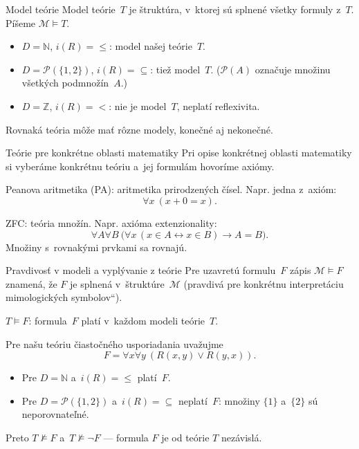 \documentclass[12pt]{beamer}
\providecommand{\uv}[1]{\quotedblbase #1\textquotedblleft}
\newcommand{\limpl}{\rightarrow}
\begin{document}
\begin{frame}{Model teórie}
  \alert{Model teórie~$T$} je štruktúra, v~ktorej sú splnené všetky formuly z~$T$.
  Píšeme $\mathcal M\models T$.
  \begin{itemize}
    \item $D=\mathbb N$, $i(R)={\le}$: model našej teórie~$T$.
    \item $D=\mathcal P(\{1,2\})$, $i(R)={\subseteq}$: tiež model~$T$. ($\mathcal P(A)$ označuje množinu všetkých podmnožín~$A$.)
    \item $D=\mathbb Z$, $i(R)={<}$: nie je model~$T$, neplatí reflexivita.
  \end{itemize}

  \medskip
  Rovnaká teória môže mať rôzne modely, konečné aj nekonečné.
\end{frame}

\begin{frame}{Teórie pre konkrétne oblasti matematiky}
  Pri opise konkrétnej oblasti matematiky si vyberáme konkrétnu teóriu
  a~jej formulám hovoríme \alert{axiómy}.

  \medskip
  \alert{Peanova aritmetika (PA)}: aritmetika prirodzených čísel.
  Napr. jedna z~axióm:
  \[
    \forall x\ (x+0=x).
  \]

  \alert{ZFC}: teória množín. Napr. axióma extenzionality:
  \[
    \forall A\forall B\ \bigl(\forall x\,(x\in A\leftrightarrow x\in B)
      \limpl A=B\bigr).
  \]
  Množiny s~rovnakými prvkami sa rovnajú.
\end{frame}

\begin{frame}{Pravdivosť v modeli a vyplývanie z teórie}
  Pre uzavretú formulu~$F$ zápis
  \alert{$\mathcal M\models F$} znamená, že $F$ je splnená v~štruktúre~$\mathcal M$ (\uv{pravdivá pre konkrétnu interpretáciu mimologických symbolov}).

  \medskip
  \alert{$T\models F$}: formula~$F$ platí v~\alert{každom modeli} teórie~$T$.

  \medskip
  Pre našu teóriu čiastočného usporiadania uvažujme
  \[
    F=\forall x\forall y\ (R(x,y)\lor R(y,x)).
  \]
  \vspace*{-5mm}
  \begin{itemize}
    \item Pre $D=\mathbb N$ a~$i(R)={\le}$ platí~$F$.
    \item Pre $D=\mathcal P(\{1,2\})$ a~$i(R)={\subseteq}$ neplatí~$F$:
      množiny $\{1\}$ a~$\{2\}$ sú neporovnateľné.
  \end{itemize}
  Preto $T\not\models F$ a~$T\not\models\lnot F$ --- formula $F$ je od teórie $T$ nezávislá.
\end{frame}
\end{document}
